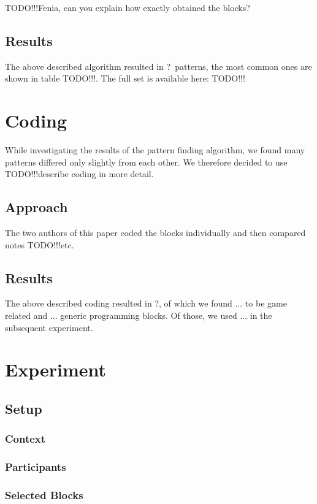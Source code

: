 \documentclass[preprint]{sigplanconf}
\newcommand{\nPatternsInitial}{?}
\newcommand{\nPatternsCoded}{?}
\newcommand{\todo}{TODO!!!}
\begin{document}
\todo Fenia, can you explain how exactly obtained the blocks?

\subsection{Results}

The above described algorithm resulted in \nPatternsInitial~patterns, the most common ones are shown in table \todo. The full set is available here: \todo

\section{Coding}
\label{sec:coding}
While investigating the results of the pattern finding algorithm, we found many patterns differed only slightly from each other. We therefore decided to use \todo describe coding in more detail. 

\subsection{Approach}
The two authors of this paper coded the blocks individually and then compared notes \todo etc.

\subsection{Results}
The above described coding resulted in \nPatternsCoded, of which we found ... to be game related and ... generic programming blocks. Of those, we used ... in the subsequent experiment.

\section{Experiment}
\label{sec:experiment}

\subsection{Setup}
\subsubsection{Context}

\subsubsection{Participants}

\subsubsection{Selected Blocks}
\end{document}
